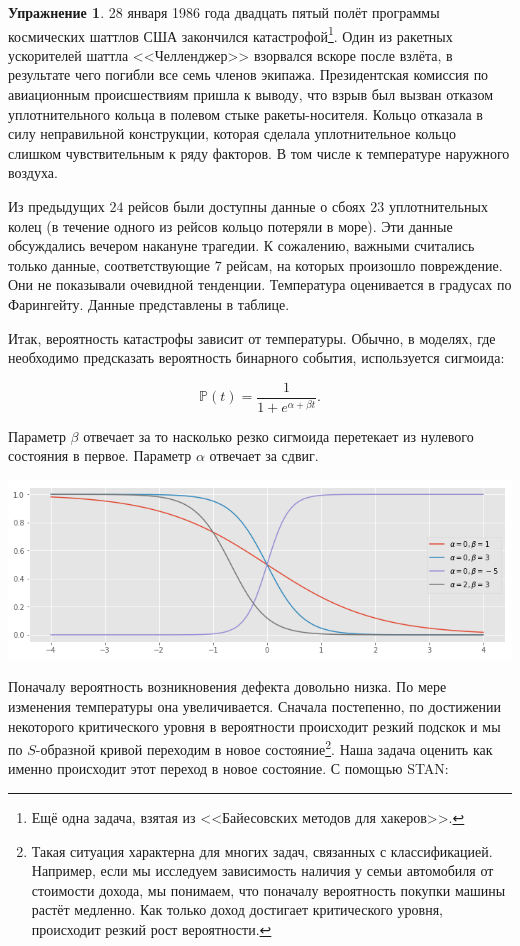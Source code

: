 \documentclass[12pt, a4paper, oneside]{extreport}
\def \mbb{\mathbb}
\def \PP{\mbb{P}}
\theoremstyle{plain}              %
\theoremstyle{definition}         %
\newtheorem{problem}{\color{myblue} Упражнение}
\begin{document}
\begin{problem}

28 января 1986 года двадцать пятый полёт программы космических шаттлов США закончился катастрофой\footnote{Ещё одна задача, взятая из <<Байесовских методов для хакеров>>. }. Один из ракетных ускорителей шаттла <<Челленджер>> взорвался вскоре после взлёта, в результате чего погибли все семь членов экипажа. Президентская комиссия по авиационным происшествиям пришла к выводу, что взрыв был вызван отказом уплотнительного кольца в полевом стыке ракеты-носителя. Кольцо отказала в силу неправильной конструкции, которая сделала уплотнительное кольцо слишком чувствительным к ряду факторов. В том числе к температуре наружного воздуха.

Из предыдущих $24$ рейсов были доступны данные о сбоях $23$ уплотнительных колец (в течение одного из рейсов кольцо потеряли в море).  Эти данные обсуждались вечером накануне трагедии. К сожалению,  важными считались только данные, соответствующие $7$ рейсам, на которых произошло повреждение. Они не показывали очевидной тенденции. Температура оценивается в градусах по Фарингейту. Данные представлены в таблице.


Итак, вероятность катастрофы зависит от температуры. Обычно, в моделях, где необходимо предсказать вероятность бинарного события, используется сигмоида: 

\[ \PP(t) = \frac{1}{1 + e^{\alpha + \beta t}}.\]

Параметр $\beta$ отвечает за то насколько резко сигмоида перетекает из нулевого состояния в первое. Параметр $\alpha$ отвечает за сдвиг. 

\begin{center}
\includegraphics[scale=0.5]{sigmoida.png}
\end{center}

Поначалу вероятность возникновения дефекта довольно низка. По мере изменения температуры она увеличивается. Сначала постепенно, по достижении некоторого критического уровня в вероятности происходит резкий подскок и мы по $S$-образной кривой переходим в новое состояние\footnote{Такая ситуация характерна для многих задач, связанных с классификацией. Например, если мы исследуем зависимость наличия у семьи автомобиля от стоимости дохода, мы понимаем, что поначалу вероятность покупки машины растёт медленно. Как только доход достигает критического уровня, происходит резкий рост вероятности.}. Наша задача оценить как именно происходит этот переход в новое состояние. С помощью STAN: 


\end{problem}
\end{document}
